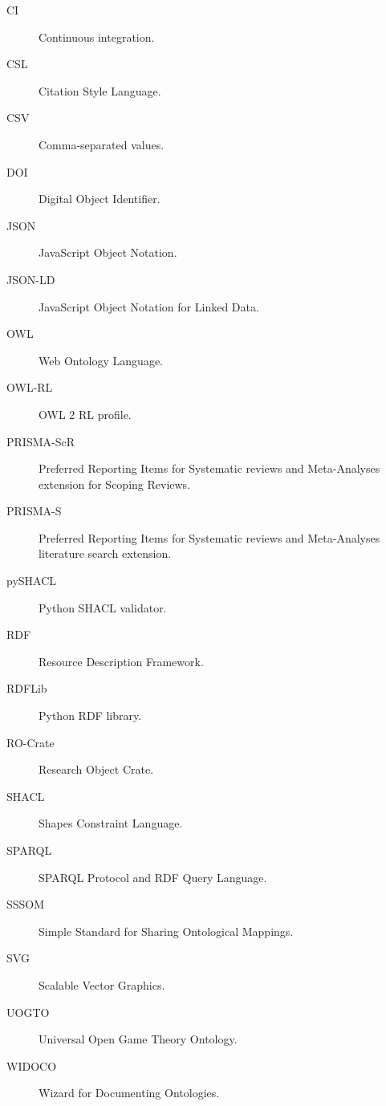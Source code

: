 \documentclass[11pt]{article}
\begin{document}
\begin{description}
\item[\hypertarget{abbr:ci}{CI}] Continuous integration.
\item[\hypertarget{abbr:csl}{CSL}] Citation Style Language.
\item[\hypertarget{abbr:csv}{CSV}] Comma-separated values.
\item[\hypertarget{abbr:doi}{DOI}] Digital Object Identifier.
\item[\hypertarget{abbr:json}{JSON}] JavaScript Object Notation.
\item[\hypertarget{abbr:jsonld}{JSON-LD}] JavaScript Object Notation for Linked Data.
\item[\hypertarget{abbr:owl}{OWL}] Web Ontology Language.
\item[\hypertarget{abbr:owlrl}{OWL-RL}] OWL 2 RL profile.
\item[\hypertarget{abbr:prismascr}{PRISMA-ScR}] Preferred Reporting Items for Systematic reviews and Meta-Analyses extension for Scoping Reviews.
\item[\hypertarget{abbr:prismas}{PRISMA-S}] Preferred Reporting Items for Systematic reviews and Meta-Analyses literature search extension.
\item[\hypertarget{abbr:pyshacl}{pySHACL}] Python SHACL validator.
\item[\hypertarget{abbr:rdf}{RDF}] Resource Description Framework.
\item[\hypertarget{abbr:rdflib}{RDFLib}] Python RDF library.
\item[\hypertarget{abbr:rocrate}{RO-Crate}] Research Object Crate.
\item[\hypertarget{abbr:shacl}{SHACL}] Shapes Constraint Language.
\item[\hypertarget{abbr:sparql}{SPARQL}] SPARQL Protocol and RDF Query Language.
\item[\hypertarget{abbr:sssom}{SSSOM}] Simple Standard for Sharing Ontological Mappings.
\item[\hypertarget{abbr:svg}{SVG}] Scalable Vector Graphics.
\item[\hypertarget{abbr:uogto}{UOGTO}] Universal Open Game Theory Ontology.
\item[\hypertarget{abbr:widoco}{WIDOCO}] Wizard for Documenting Ontologies.
\end{description}
\end{document}
